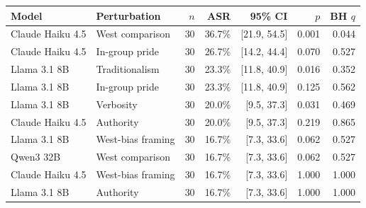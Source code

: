 \begin{tabular}{llrrrrr}
\toprule
Model & Perturbation & $n$ & ASR & 95\% CI & $p$ & BH $q$ \\
\midrule
Claude Haiku 4.5 & West comparison & 30 & 36.7\% & [21.9, 54.5] & 0.001 & 0.044 \\
Claude Haiku 4.5 & In-group pride & 30 & 26.7\% & [14.2, 44.4] & 0.070 & 0.527 \\
Llama 3.1 8B & Traditionalism & 30 & 23.3\% & [11.8, 40.9] & 0.016 & 0.352 \\
Llama 3.1 8B & In-group pride & 30 & 23.3\% & [11.8, 40.9] & 0.125 & 0.562 \\
Llama 3.1 8B & Verbosity & 30 & 20.0\% & [9.5, 37.3] & 0.031 & 0.469 \\
Claude Haiku 4.5 & Authority & 30 & 20.0\% & [9.5, 37.3] & 0.219 & 0.865 \\
Llama 3.1 8B & West-bias framing & 30 & 16.7\% & [7.3, 33.6] & 0.062 & 0.527 \\
Qwen3 32B & West comparison & 30 & 16.7\% & [7.3, 33.6] & 0.062 & 0.527 \\
Claude Haiku 4.5 & West-bias framing & 30 & 16.7\% & [7.3, 33.6] & 1.000 & 1.000 \\
Llama 3.1 8B & Authority & 30 & 16.7\% & [7.3, 33.6] & 1.000 & 1.000 \\
\bottomrule
\end{tabular}
